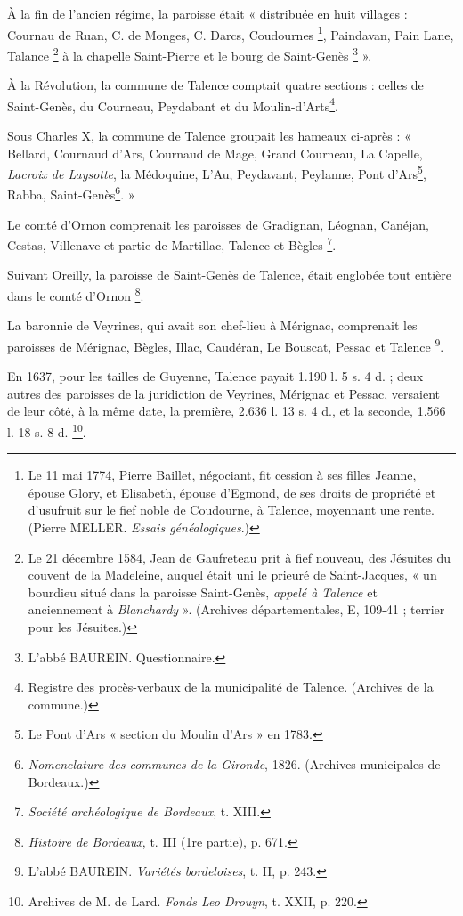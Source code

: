 À la fin de l'ancien régime, la paroisse était « distribuée en huit villages : Cournau de Ruan, C. de Monges, C. Darcs, Coudournes \footnote{Le 11 mai 1774, Pierre Baillet, négociant, fit cession à ses filles Jeanne, épouse Glory, et Elisabeth, épouse d'Egmond, de ses droits de propriété et d'usufruit sur le fief noble de Coudourne, à Talence, moyennant une rente. (Pierre MELLER. \textit{Essais généalogiques}.) }, Paindavan, Pain Lane, Talance \footnote{Le 21 décembre 1584, Jean de Gaufreteau prit à fief nouveau, des Jésuites du couvent de la Madeleine, auquel était uni le prieuré de Saint-Jacques, « un bourdieu situé dans la paroisse Saint-Genès, \textit{appelé à Talence} et anciennement à \textit{Blanchardy} ». (Archives départementales, E, 109-41 ; terrier pour les Jésuites.)} à la chapelle Saint-Pierre et le bourg de Saint-Genès \footnote{L'abbé BAUREIN. Questionnaire.} ». 

À la Révolution, la commune de Talence comptait quatre sections : celles de Saint-Genès, du Courneau, Peydabant et du Moulin-d'Arts\footnote{Registre des procès-verbaux de la municipalité de Talence. (Archives de la commune.)}.

Sous Charles X, la commune de Talence groupait les hameaux ci-après : « Bellard, Cournaud d'Ars, Cournaud de Mage, Grand Courneau, La Capelle, \textit{Lacroix de Laysotte}, la Médoquine, L'Au, Peydavant, Peylanne, Pont d'Ars\footnote{Le Pont d'Ars « section du Moulin d'Ars » en 1783.}, Rabba, Saint-Genès\footnote{\textit{Nomenclature des communes de la Gironde}, 1826. (Archives municipales de Bordeaux.)}. »

Le comté d'Ornon comprenait les paroisses de Gradignan, Léognan, Canéjan, Cestas, Villenave et partie de Martillac, Talence et Bègles 
\footnote{\textit{Société archéologique de Bordeaux}, t. XIII.}. 

Suivant Oreilly, la paroisse de Saint-Genès de Talence, était englobée tout entière dans le comté d'Ornon \footnote{\textit{Histoire de Bordeaux}, t. III (1re partie), p. 671.}.

La baronnie de Veyrines, qui avait son chef-lieu à Mérignac, comprenait les paroisses de Mérignac, Bègles, Illac, Caudéran, Le Bouscat, Pessac et Talence \footnote{L'abbé BAUREIN. \textit{Variétés bordeloises}, t. II, p. 243.}.

En 1637, pour les tailles de Guyenne, Talence payait 1.190 l. 5 s. 4 d. ; deux autres des paroisses de la juridiction de Veyrines, Mérignac et Pessac, versaient de leur côté, à la même date, la première, 2.636 l. 13 s. 4 d., et la seconde, 1.566 l. 18 s. 8 d. \footnote{Archives de M. de Lard. \textit{Fonds Leo Drouyn}, t. XXII, p. 220.}.

